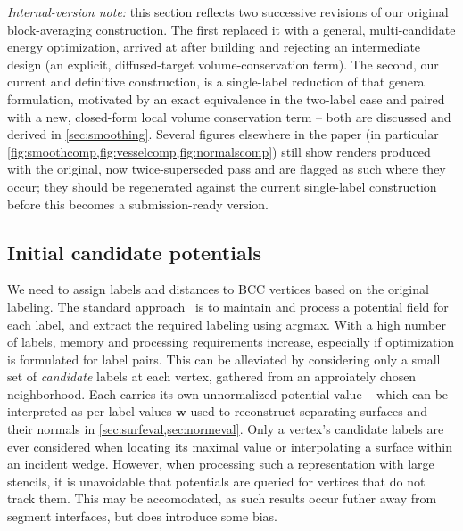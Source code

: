 \documentclass[journal]{vgtc}                     %
\begin{document}
\emph{Internal-version note:} this section reflects two successive revisions of our original block-averaging construction. The first replaced it with a general, multi-candidate energy optimization, arrived at after building and rejecting an intermediate design (an explicit, diffused-target volume-conservation term). The second, our current and definitive construction, is a single-label reduction of that general formulation, motivated by an exact equivalence in the two-label case and paired with a new, closed-form local volume conservation term -- both are discussed and derived in \cref{sec:smoothing}. Several figures elsewhere in the paper (in particular \cref{fig:smoothcomp,fig:vesselcomp,fig:normalscomp}) still show renders produced with the original, now twice-superseded pass and are flagged as such where they occur; they should be regenerated against the current single-label construction before this becomes a submission-ready version.

\subsection{Initial candidate potentials} \label{sec:initial}

We need to assign labels and distances to BCC vertices based on the original labeling. The standard approach~\cite{?} is to maintain and process a potential field for each label, and extract the required labeling using argmax. With a high number of labels, memory and processing requirements increase, especially if optimization is formulated for label pairs. This can be alleviated by considering only a small set of \emph{candidate} labels at each vertex, gathered from an approiately chosen neighborhood. Each carries its own unnormalized potential value -- which can be interpreted as per-label values $\mathbf{w}$ used to reconstruct separating surfaces and their normals in \cref{sec:surfeval,sec:normeval}. Only a vertex's candidate labels are ever considered when locating its maximal value or interpolating a surface within an incident wedge. However, when processing such a representation with large stencils, it is unavoidable that potentials are queried for vertices that do not track them. This may be accomodated, as such results occur futher away from segment interfaces, but does introduce some bias.

\end{document}

